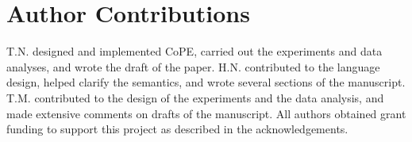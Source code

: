 \section*{Author Contributions}  
T.N. designed and implemented CoPE, carried out the experiments and
data analyses, and wrote the draft of the paper. H.N. contributed to
the language design, helped clarify the semantics, and wrote several
sections of the manuscript. T.M. contributed to the design of the
experiments and the data analysis, and made extensive comments on
drafts of the manuscript. All authors obtained grant funding to
support this project as described in the acknowledgements.


